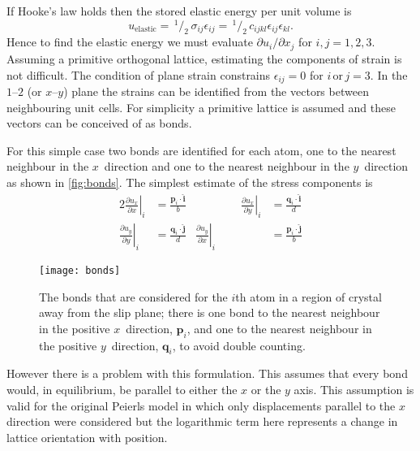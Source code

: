 If Hooke's law holds then the stored elastic energy per unit volume is
\begin{equation}
u_{\text{elastic}} =\, ^{1}\!/_{2}\, \sigma_{ij} \epsilon_{ij} =\, ^{1}\!/_{2}\, c_{ijkl} \epsilon_{ij} \epsilon_{kl}.
\end{equation}
Hence to find the elastic energy we must evaluate \({\partial u_i}/{\partial x_j}\) for $i, j = 1, 2, 3$.
Assuming a primitive orthogonal lattice, estimating the components of strain is not difficult. The  condition of plane strain constrains $\epsilon_{ij} = 0$ for $i\, \text{or}\, j=3$. In the $1$--$2$ (or $x$--$y$) plane the strains can be identified from the vectors between neighbouring unit cells. For simplicity a primitive lattice is assumed and these vectors can be conceived of as bonds.

For this simple case two bonds are identified for each atom, one to the nearest neighbour in the $x$~direction and one to the nearest neighbour in the $y$~direction as shown in \autoref{fig:bonds}. The simplest estimate of the stress components is
\begin{alignat}{2}\label{eqn:estimate_strains}
\left. \frac{\partial u_x}{\partial x}\right|_i &= \frac{\mathbf{p}_i \cdot \mathbf{\hat{i}}}{b} &\qquad\qquad
\left. \frac{\partial u_x}{\partial y}\right|_i &= \frac{\mathbf{q}_i \cdot \mathbf{\hat{i}}}{d} \nonumber\\
\left. \frac{\partial u_y}{\partial y}\right|_i &= \frac{\mathbf{q}_i \cdot \mathbf{\hat{j}}}{d} &
\left. \frac{\partial u_y}{\partial x}\right|_i &= \frac{\mathbf{p}_i \cdot \mathbf{\hat{j}}}{b}
\end{alignat}


\begin{figure}
\centering
\texttt{[image: bonds]}
\caption[Strained bonds in a dislocated crystal.]{The bonds that are considered for the $i$th atom in a region of crystal away from the slip plane; there is one bond to the nearest neighbour in the positive $x$~direction, $\mathbf{p}_i$, and one to the nearest neighbour in the positive $y$~direction, $\mathbf{q}_i$, to avoid double counting.\label{fig:bonds} }
\end{figure}





However there is a problem with this formulation. This assumes that every bond would, in equilibrium, be parallel to either the $x$ or the $y$ axis. This assumption is valid for the original Peierls model in which only displacements parallel to the $x$ direction were considered but the logarithmic term here represents a change in lattice orientation with position. 

